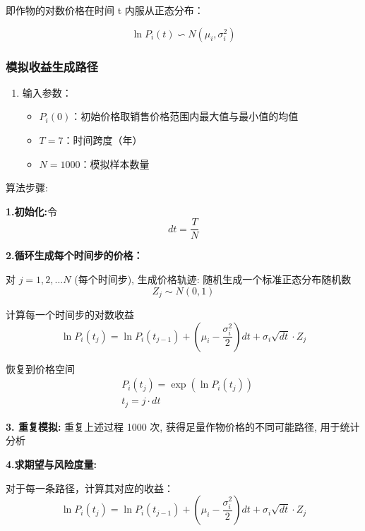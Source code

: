 \documentclass[12pt]{ctexart}
\begin{document}
	
	即作物的对数价格在时间 t 内服从正态分布：
	
	\begin{equation}
	\ln P_i(t) \backsim N\left(\mu_i, \sigma_i^2\right)
\end{equation}
	\subsubsection{模拟收益生成路径}  
	\begin{enumerate}  
		\item 输入参数：  
		\begin{itemize}  
			\item $P_i(0)$：初始价格取销售价格范围内最大值与最小值的均值  
			\item $T = 7$：时间跨度（年）  
			\item $N = 1000$：模拟样本数量  
		\end{itemize}  
	\end{enumerate}
	
	算法步骤:
	\newline
	
	
	\textbf{1.初始化:}令 \[d t=\frac{T}{N}\]
	
	
	\textbf{2.循环生成每个时间步的价格：}

	对 $j=1,2, \ldots N$ (每个时间步), 生成价格轨迹:
	随机生成一个标准正态分布随机数
	\begin{equation}
	Z_j \sim N(0,1)
	\end{equation}
	
	
	计算每一个时间步的对数收益
	\begin{equation}
	\ln P_i\left(t_j\right)=\ln P_i\left(t_{j-1}\right)+\left(\mu_i-\frac{\sigma_i^2}{2}\right) d t+\sigma_i \sqrt{d t} \cdot Z_j
	\end{equation}
	
	
	恢复到价格空间
	\begin{equation}
	\begin{aligned}
		& P_i\left(t_j\right)=\exp \left(\ln P_i\left(t_j\right)\right) \\
		& t_j=j \cdot d t
	\end{aligned}
    \end{equation}
    
    
	\textbf{3. 重复模拟:}
	重复上述过程 1000 次, 获得足量作物价格的不同可能路径, 用于统计分析
	
	
	\textbf{4.求期望与风险度量:}

	对于每一条路径，计算其对应的收益：
	\begin{equation}
	\ln P_i\left(t_j\right)=\ln P_i\left(t_{j-1}\right)+\left(\mu_i-\frac{\sigma_i^2}{2}\right) d t+\sigma_i \sqrt{d t} \cdot Z_j
	\end{equation}
	
\end{document}
